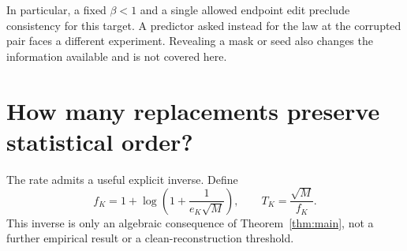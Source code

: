 \documentclass[11pt]{article}
\theoremstyle{remark}\newtheorem{remark}[theorem]{Remark}
\newcommand{\1}{\mathbf 1}
\begin{document}
In particular, a fixed $\beta<1$ and a single allowed endpoint edit preclude consistency for this target. A predictor asked instead for the law at the corrupted pair faces a different experiment. Revealing a mask or seed also changes the information available and is not covered here.

\section{How many replacements preserve statistical order?}\label{sec:tolerance}
The rate admits a useful explicit inverse. Define
\[
 f_K=1+\log\left(1+\frac1{e_K\sqrt M}\right),
 \qquad T_K=\frac{\sqrt M}{f_K}.
\]
This inverse is only an algebraic consequence of Theorem~\ref{thm:main}, not a further empirical result or a clean-reconstruction threshold.
\end{document}
